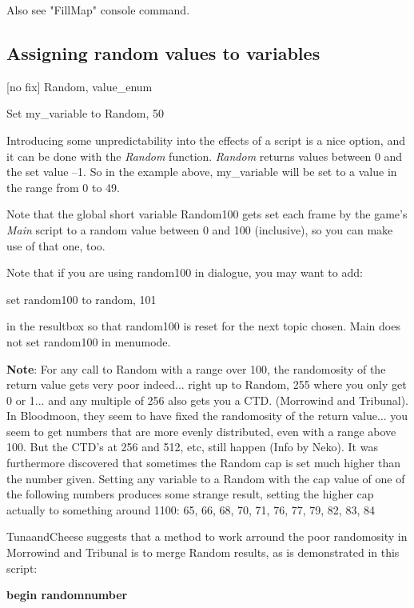 \documentclass[
]{article}
\begin{document}


Also see "FillMap" console command.

\hypertarget{assigning-random-values-to-variables}{%
\subsection{Assigning random values to
variables}\label{assigning-random-values-to-variables}}

{[}no fix{]} Random, value\_enum

Set my\_variable to Random, 50

Introducing some unpredictability into the effects of a script is a nice
option, and it can be done with the \emph{Random} function.
\emph{Random} returns values between 0 and the set value --1. So in the
example above, my\_variable will be set to a value in the range from 0
to 49.

Note that the global short variable Random100 gets set each frame by the
game's \emph{Main} script to a random value between 0 and 100
(inclusive), so you can make use of that one, too.

Note that if you are using random100 in dialogue, you may want to add:

set random100 to random, 101

in the resultbox so that random100 is reset for the next topic chosen.
Main does not set random100 in menumode.

\textbf{Note}: For any call to Random with a range over 100, the
randomosity of the return value gets very poor indeed... right up to
Random, 255 where you only get 0 or 1... and any multiple of 256 also
gets you a CTD. (Morrowind and Tribunal). In Bloodmoon, they seem to
have fixed the randomosity of the return value... you seem to get
numbers that are more evenly distributed, even with a range above 100.
But the CTD's at 256 and 512, etc, still happen (Info by Neko). It was
furthermore discovered that sometimes the Random cap is set much higher
than the number given. Setting any variable to a Random with the cap
value of one of the following numbers produces some strange result,
setting the higher cap actually to something around 1100: 65, 66, 68,
70, 71, 76, 77, 79, 82, 83, 84

TunaandCheese suggests that a method to work arround the poor
randomosity in Morrowind and Tribunal is to merge Random results, as is
demonstrated in this script:

\textbf{begin randomnumber}
\end{document}
